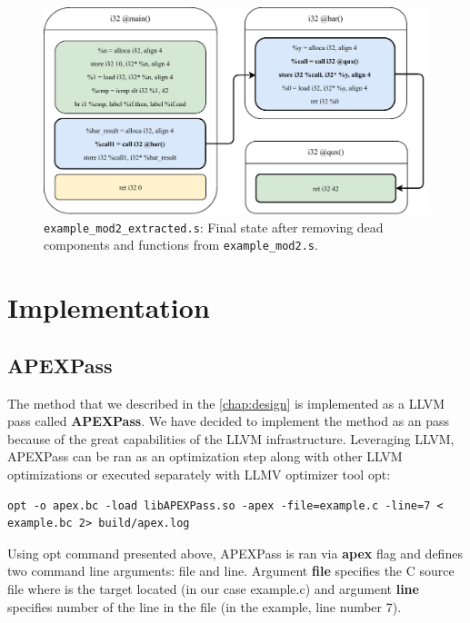 \documentclass[12pt, twoside]{fithesis2}
\renewcommand{\_}{\leavevmode \kern0.07em\vbox{\hrule width0.4em}}
\begin{document}

\begin{figure}[ht]
    \centering
    \includegraphics[]{images/example_mod2/example_mod2_removing_done.pdf}
    \caption{
    \texttt{example_mod2_extracted.s}:
    Final state after removing dead components and functions from
    \texttt{example_mod2.s}.
    }
    \label{fig:mod2_done}
\end{figure}

\chapter{Implementation}
\label{chap:implementation}

\section{APEXPass}
\label{sec:impl_apexpass}

The method that we described in the \autoref{chap:design} is implemented as a
LLVM pass called \textbf{APEXPass}.
We have decided to implement the method as an pass because of the great
capabilities of the LLVM infrastructure. Leveraging LLVM, APEXPass can be ran
as an optimization step along with other LLVM optimizations or executed
separately with LLMV optimizer tool opt:

\begin{verbatim}
opt -o apex.bc -load libAPEXPass.so -apex -file=example.c -line=7 < example.bc 2> build/apex.log
\end{verbatim}

Using opt command presented above, APEXPass is ran via \textbf{apex} flag and defines
two command line arguments: file and line.
Argument \textbf{file} specifies the C source file where is the target located
(in our case example.c) and argument \textbf{line} specifies number of the line
in the file (in the example, line number 7).
\end{document}
